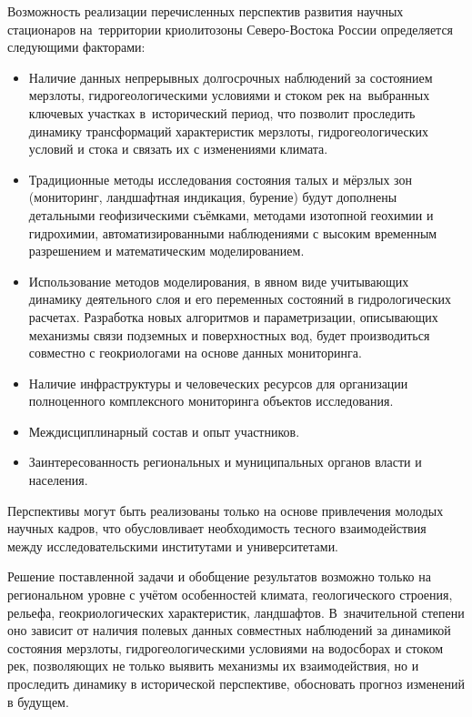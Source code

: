 Возможность реализации перечисленных перспектив развития научных стационаров на~территории криолитозоны Северо-Востока России определяется следующими факторами:
\begin{itemize}[noitemsep]\vspace{-6pt}
\item Наличие данных непрерывных долгосрочных наблюдений за состоянием мерзлоты, гидрогеологическими условиями и стоком рек на~выбранных ключевых участках в~исторический период, что позволит проследить динамику трансформаций характеристик мерзлоты, гидрогеологических условий и стока и связать их с изменениями климата.\vspace{2pt}
\item Традиционные методы исследования состояния талых и мёрзлых зон (мониторинг, ландшафтная индикация, бурение) будут дополнены детальными геофизическими съёмками, методами изотопной геохимии и гидрохимии, автоматизированными наблюдениями с высоким временным разрешением и математическим моделированием.\vspace{2pt}
\item Использование методов моделирования, в явном виде учитывающих динамику деятельного слоя и его переменных состояний в гидрологических расчетах. Разработка новых алгоритмов и параметризации, описывающих механизмы связи подземных и поверхностных вод, будет производиться совместно с геокриологами на основе данных мониторинга.\vspace{2pt}
\item Наличие инфраструктуры и человеческих ресурсов для организации полноценного комплексного мониторинга объектов исследования.\vspace{2pt}
\item Междисциплинарный состав и опыт участников.\vspace{2pt}
\item Заинтересованность региональных и муниципальных органов власти и населения.
\end{itemize}
 \vspace{-6pt}

Перспективы могут быть реализованы только на основе привлечения молодых научных кадров, что обусловливает необходимость тесного взаимодействия между исследовательскими институтами и университетами.

Решение поставленной задачи и обобщение результатов возможно только на региональном уровне с учётом особенностей климата, геологического строения, рельефа, геокриологических характеристик, ландшафтов. В~значительной степени оно зависит от наличия полевых данных совместных наблюдений за динамикой состояния мерзлоты, гидрогеологическими условиями на водосборах и стоком рек, позволяющих не только выявить механизмы их взаимодействия, но и проследить динамику в исторической перспективе, обосновать прогноз изменений в будущем.

